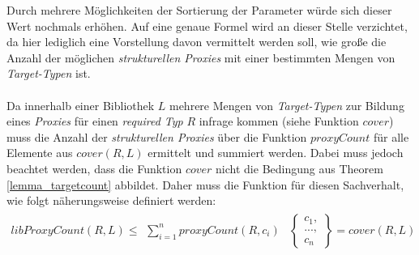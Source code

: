 \noindent
Durch mehrere Möglichkeiten der Sortierung der Parameter würde sich dieser Wert nochmals erhöhen. Auf eine genaue Formel wird an dieser Stelle verzichtet, da hier lediglich eine Vorstellung davon vermittelt werden soll, wie große die Anzahl der möglichen \emph{strukturellen Proxies} mit einer bestimmten Mengen von \emph{Target-Typen} ist.
\\\\
Da innerhalb einer Bibliothek $L$ mehrere Mengen von \emph{Target-Typen} zur Bildung eines \emph{Proxies} für einen \emph{required Typ} $R$ infrage kommen (siehe Funktion $\mathit{cover}$) muss die Anzahl der \emph{strukturellen Proxies} über die Funktion $\mathit{proxyCount}$ für alle Elemente aus $\mathit{cover(R,L)}$ ermittelt und summiert werden. Dabei muss jedoch beachtet werden, dass die Funktion $\mathit{cover}$ nicht die Bedingung aus Theorem \ref{lemma_targetcount} abbildet. Daher muss die Funktion für diesen Sachverhalt, wie folgt näherungsweise definiert werden:
\begin{gather*}
\mathit{libProxyCount(R,L)} \leq 
\begin{array}{l|l}
\sum_{i=1}^{n}\mathit{proxyCount(R,c_i)}
&
\left\{
\begin{array}{l}
c_1,\\
...,\\
c_n
\end{array}
\right\} = \mathit{cover(R,L)}
\end{array}
\end{gather*}